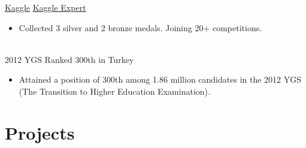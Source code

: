 \documentclass[letterpaper]{DS_class_file} %
\begin{document}
\begin{twenty} %
	\twentyitem
	{\href{https://www.kaggle.com}{Kaggle}}
	{}
	{\hspace{0.3cm}\href{https://www.kaggle.com/mbkinaci}{Kaggle Expert}}
	{}
	{}
	{
		{\begin{itemize}
				\item Collected 3 silver and 2 bronze medals. Joining 20+ competitions.
		\end{itemize}}
	}
	\\
	\twentyitem
	{2012 YGS}
	{}
	{\hspace{0.3cm}Ranked 300th in Turkey}
	{}
	{}
	{\begin{itemize}
			\item Attained a position of 300th among 1.86 million candidates in the 2012 YGS (The Transition to Higher Education Examination).    
   
	\end{itemize}}

\end{twenty}

\newpage

\makeseconda %

\section{Projects}
\end{document}
